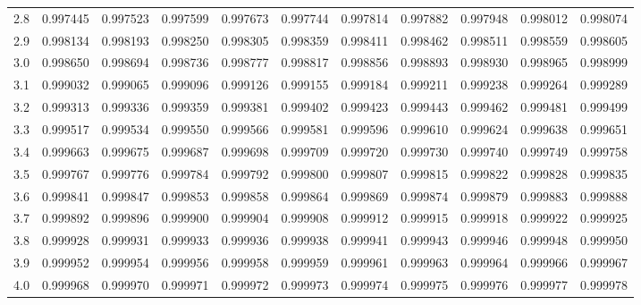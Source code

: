 \documentclass{article}
\begin{document}
\begin{center}
\begin{footnotesize}
\begin{tabular}{|r|rrrrrrrrrr|}
2.8 & 0.997445 & 0.997523 & 0.997599 & 0.997673 & 0.997744 & 0.997814 & 0.997882 & 0.997948 & 0.998012 & 0.998074 \\
2.9 & 0.998134 & 0.998193 & 0.998250 & 0.998305 & 0.998359 & 0.998411 & 0.998462 & 0.998511 & 0.998559 & 0.998605 \\
3.0 & 0.998650 & 0.998694 & 0.998736 & 0.998777 & 0.998817 & 0.998856 & 0.998893 & 0.998930 & 0.998965 & 0.998999 \\
3.1 & 0.999032 & 0.999065 & 0.999096 & 0.999126 & 0.999155 & 0.999184 & 0.999211 & 0.999238 & 0.999264 & 0.999289 \\
3.2 & 0.999313 & 0.999336 & 0.999359 & 0.999381 & 0.999402 & 0.999423 & 0.999443 & 0.999462 & 0.999481 & 0.999499 \\
3.3 & 0.999517 & 0.999534 & 0.999550 & 0.999566 & 0.999581 & 0.999596 & 0.999610 & 0.999624 & 0.999638 & 0.999651 \\
3.4 & 0.999663 & 0.999675 & 0.999687 & 0.999698 & 0.999709 & 0.999720 & 0.999730 & 0.999740 & 0.999749 & 0.999758 \\
3.5 & 0.999767 & 0.999776 & 0.999784 & 0.999792 & 0.999800 & 0.999807 & 0.999815 & 0.999822 & 0.999828 & 0.999835 \\
3.6 & 0.999841 & 0.999847 & 0.999853 & 0.999858 & 0.999864 & 0.999869 & 0.999874 & 0.999879 & 0.999883 & 0.999888 \\
3.7 & 0.999892 & 0.999896 & 0.999900 & 0.999904 & 0.999908 & 0.999912 & 0.999915 & 0.999918 & 0.999922 & 0.999925 \\
3.8 & 0.999928 & 0.999931 & 0.999933 & 0.999936 & 0.999938 & 0.999941 & 0.999943 & 0.999946 & 0.999948 & 0.999950 \\
3.9 & 0.999952 & 0.999954 & 0.999956 & 0.999958 & 0.999959 & 0.999961 & 0.999963 & 0.999964 & 0.999966 & 0.999967 \\
4.0 & 0.999968 & 0.999970 & 0.999971 & 0.999972 & 0.999973 & 0.999974 & 0.999975 & 0.999976 & 0.999977 & 0.999978 \\
\hline
\end{tabular}
\end{footnotesize}
\end{center}

\newpage
\end{document}
